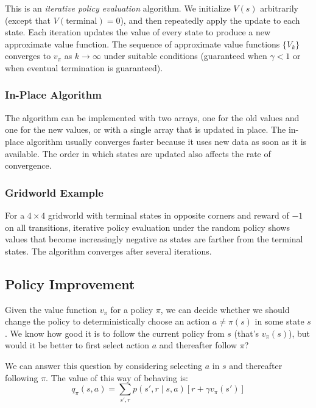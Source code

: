 \documentclass[12pt]{article}
\begin{document}
This is an \textit{iterative policy evaluation} algorithm. We initialize $V(s)$ arbitrarily (except that $V(\text{terminal}) = 0$), and then repeatedly apply the update to each state. Each iteration updates the value of every state to produce a new approximate value function. The sequence of approximate value functions $\{V_k\}$ converges to $v_\pi$ as $k \to \infty$ under suitable conditions (guaranteed when $\gamma < 1$ or when eventual termination is guaranteed).

\subsubsection{In-Place Algorithm}

The algorithm can be implemented with two arrays, one for the old values and one for the new values, or with a single array that is updated in place. The in-place algorithm usually converges faster because it uses new data as soon as it is available. The order in which states are updated also affects the rate of convergence.

\subsubsection{Gridworld Example}

For a $4 \times 4$ gridworld with terminal states in opposite corners and reward of $-1$ on all transitions, iterative policy evaluation under the random policy shows values that become increasingly negative as states are farther from the terminal states. The algorithm converges after several iterations.

\subsection{Policy Improvement}

Given the value function $v_\pi$ for a policy $\pi$, we can decide whether we should change the policy to deterministically choose an action $a \ne \pi(s)$ in some state $s$. We know how good it is to follow the current policy from $s$ (that's $v_\pi(s)$), but would it be better to first select action $a$ and thereafter follow $\pi$?

We can answer this question by considering selecting $a$ in $s$ and thereafter following $\pi$. The value of this way of behaving is:
\begin{equation}
q_\pi(s, a) = \sum_{s', r} p(s', r \mid s, a)[r + \gamma v_\pi(s')]
\end{equation}
\end{document}
